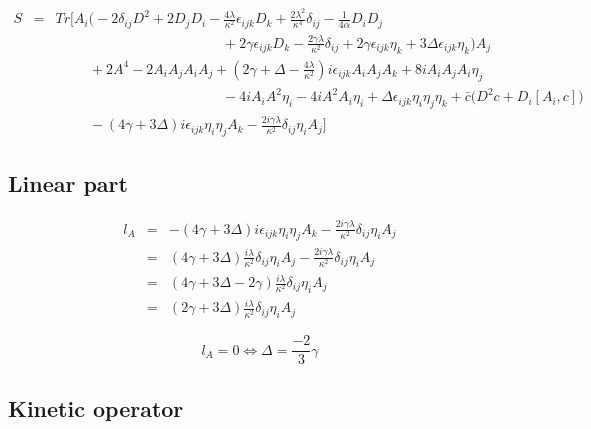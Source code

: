 \documentclass[a4paper,11pt]{article} %
\numberwithin{equation}{section} %
\numberwithin{figure}{section} %
\theoremstyle{plain} %
\theoremstyle{definition} %
\theoremstyle{remark} %
\begin{document}
\begin{eqnarray*}
 S &=& Tr \Bigg[ A_i \Bigg( - 2 \delta_{ij} D^2 + 2 D_j D_i - \frac{4\lambda}{\kappa^2} \epsilon_{ijk}  D_k + \frac{2\lambda^2}{\kappa^4} \delta_{ij} - \frac{1}{4 \alpha} D_i D_j \\
   && \hspace{5cm} + 2 \gamma \epsilon_{ijk} D_k - \frac{2 \gamma \lambda}{\kappa^{2}} \delta_{ij} + 2 \gamma \epsilon_{ijk} \eta_{k} + 3 \Delta \epsilon_{ijk} \eta_k \Bigg) A_j \\
   && \hspace{1cm} + 2 A^4 - 2 A_i A_j A_i A_j + ( 2 \gamma + \Delta - \frac{4\lambda}{\kappa^2} ) i \epsilon_{ijk} A_i A_j A_k + 8i A_i A_j A_i \eta_j \\ 
   && \hspace{5cm} - 4i A_i A^2 \eta_i - 4i A^2 A_i \eta_i + \Delta \epsilon_{ijk} \eta_{i} \eta_j \eta_k + \bar{c} \big( D^2 c +D_i [A_i , c] \big) \\
   && \hspace{1cm}  - ( 4 \gamma + 3 \Delta ) i \epsilon_{ijk} \eta_i \eta_j A_k - \frac{2i \gamma \lambda}{\kappa^2} \delta_{ij} \eta_i A_j  \Bigg]   
\end{eqnarray*}

\subsection*{Linear part}

\begin{eqnarray*}
 l_A &=& - ( 4 \gamma + 3 \Delta ) i \epsilon_{ijk} \eta_i \eta_j A_k - \frac{2i \gamma \lambda}{\kappa^2} \delta_{ij} \eta_i A_j \\
     &=& ( 4 \gamma + 3 \Delta ) \frac{i \lambda}{\kappa^2} \delta_{ij} \eta_i A_j - \frac{2i \gamma \lambda}{\kappa^2} \delta_{ij} \eta_i A_j \\
     &=& ( 4 \gamma + 3 \Delta - 2 \gamma ) \frac{i \lambda}{\kappa^2} \delta_{ij} \eta_i A_j \\
     &=& ( 2 \gamma + 3 \Delta ) \frac{i \lambda}{\kappa^2} \delta_{ij} \eta_i A_j
\end{eqnarray*}

\begin{equation*}
 l_A = 0 \Longleftrightarrow \Delta = \frac{-2}{3} \gamma
\end{equation*}

\subsection*{Kinetic operator}
\end{document}
